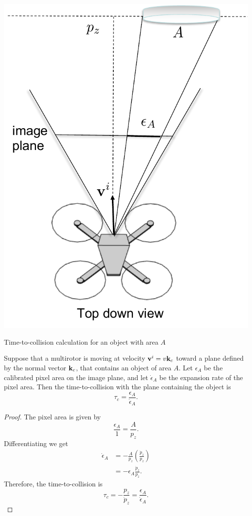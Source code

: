 \begin{marginfigure}[2in]
	\includegraphics[width=\linewidth]{chap7_optical_flow/figures/optical_flow_time_to_collision_area}
	\caption{Time-to-collision calculation for an object with area $A$}
	\label{fig:optical_flow_time_to_collision_area}
\end{marginfigure}  
\begin{theorem}
	Suppose that a multirotor is moving at velocity $\mathbf{v}^i = v\mathbf{k}_c$ toward a plane defined by the normal vector $\mathbf{k}_c$, that contains an object of area $A$.  Let $\epsilon_A$ be the calibrated pixel area on the image plane, and let $\dot{\epsilon}_A$ be the expansion rate of the pixel area.  Then the time-to-collision with the plane containing the object is
	\begin{equation}\label{eq:optical_flow_time_to_collision_area}
	\tau_c = \frac{\epsilon_A}{\dot{\epsilon}_A}.
	\end{equation}
\end{theorem}
\begin{proof}
	The pixel area is given by
	\[
	\frac{\epsilon_A}{1} = \frac{A}{p_z}.
	\]
	Differentiating we get
	\begin{align*}
	\dot{\epsilon}_A &= -\frac{A}{p_z}\left(\frac{\dot{p}_z}{p_z}\right) \\
	&= -\epsilon_A \frac{\dot{p}_z}{p_z}.
	\end{align*}
	Therefore, the time-to-collision is
	\[
	\tau_c = -\frac{p_z}{\dot{p}_z} = \frac{\epsilon_A}{\dot{\epsilon}_A}.
	\]
\end{proof}

